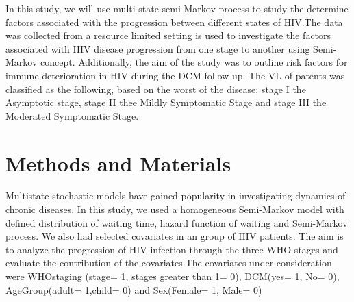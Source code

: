 \documentclass[11pt]{article}
\begin{document}
	
	In this study, we will use multi-state semi-Markov process to study the determine factors associated with the progression between different states of HIV.The data was collected from a resource limited setting is used to investigate the factors associated with HIV disease progression from one stage to another using Semi-Markov concept. Additionally, the aim of the study was to outline risk factors for immune deterioration in HIV during the DCM follow-up. The VL of patents was classified as the following, based on the worst of the disease; stage I the Asymptotic stage, stage II thee Mildly Symptomatic Stage and stage III the Moderated Symptomatic Stage. \\
	
	
	\section{Methods and Materials}
	Multistate stochastic models have gained popularity in investigating dynamics of chronic diseases. In this study, we used a homogeneous Semi-Markov model with defined distribution of waiting time, hazard function of waiting and Semi-Markov process. We also had selected covariates in an group of HIV patients. The aim is to analyze the progression of HIV infection through the three WHO stages and evaluate the contribution of the covariates.The covariates under consideration were WHOstaging (stage= 1, stages greater than 1= 0), DCM(yes= 1, No= 0), AgeGroup(adult= 1,child= 0) and Sex(Female= 1, Male= 0)\\
	
\end{document}
